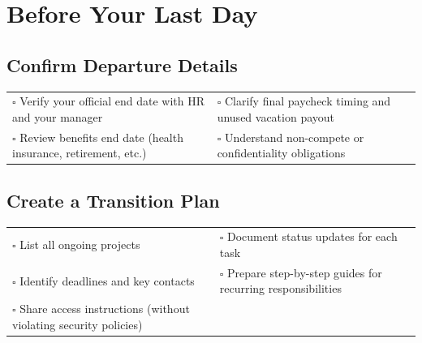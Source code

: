 
\section{Before Your Last Day}
\label{sec:before}

\subsection{Confirm Departure Details}

\begin{tabular}{p{9cm} p{8cm}}
$\square$ Verify your official end date with HR and your manager & $\square$ Clarify final paycheck timing and unused vacation payout \\ 
$\square$ Review benefits end date (health insurance, retirement, etc.) & $\square$ Understand non-compete or confidentiality obligations \\ 
\end{tabular}

\subsection{Create a Transition Plan}

\begin{tabular}{p{9cm} p{8cm}}
$\square$ List all ongoing projects & $\square$ Document status updates for each task \\ 
$\square$ Identify deadlines and key contacts & $\square$ Prepare step-by-step guides for recurring responsibilities \\ 
$\square$ Share access instructions (without violating security policies) & \\ 
\end{tabular}


